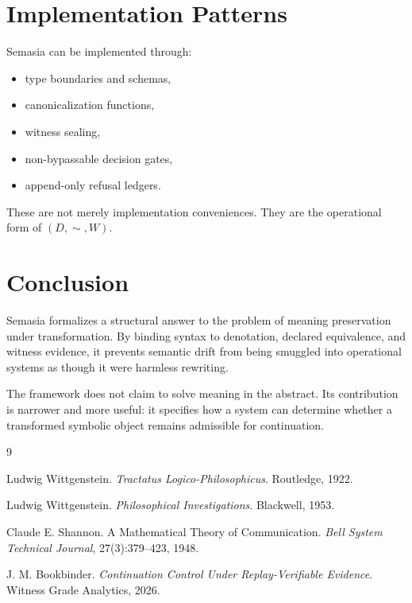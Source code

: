 \documentclass[11pt]{article}
\begin{document}
\section{Implementation Patterns}

Semasia can be implemented through:
\begin{itemize}[leftmargin=2em]
\item type boundaries and schemas,
\item canonicalization functions,
\item witness sealing,
\item non-bypassable decision gates,
\item append-only refusal ledgers.
\end{itemize}

These are not merely implementation conveniences. They are the operational form of $(D,\sim,W)$.

\section{Conclusion}

Semasia formalizes a structural answer to the problem of meaning preservation under transformation. By binding syntax to denotation, declared equivalence, and witness evidence, it prevents semantic drift from being smuggled into operational systems as though it were harmless rewriting.

The framework does not claim to solve meaning in the abstract. Its contribution is narrower and more useful: it specifies how a system can determine whether a transformed symbolic object remains admissible for continuation.


\begin{thebibliography}{9}

Ludwig Wittgenstein.
\newblock \emph{Tractatus Logico-Philosophicus}.
\newblock Routledge, 1922.

Ludwig Wittgenstein.
\newblock \emph{Philosophical Investigations}.
\newblock Blackwell, 1953.

Claude E. Shannon.
\newblock A Mathematical Theory of Communication.
\newblock \emph{Bell System Technical Journal}, 27(3):379--423, 1948.

J. M. Bookbinder.
\newblock \emph{Continuation Control Under Replay-Verifiable Evidence}.
\newblock Witness Grade Analytics, 2026.

\end{thebibliography}
\end{document}
